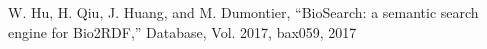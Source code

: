 \documentclass[a4paper]{jpconf}
\begin{document}
\begin{thebibliography}{0}
 W. Hu, H. Qiu, J. Huang, and M. Dumontier, ``BioSearch: a semantic search engine for Bio2RDF,'' Database, Vol. 2017, bax059, 2017 













\end{thebibliography}
\end{document}
